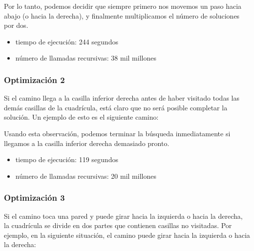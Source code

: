 Por lo tanto, podemos decidir que siempre primero
nos movemos un paso hacia abajo (o hacia la derecha),
y finalmente multiplicamos el número de soluciones por dos.

\begin{itemize}
\item
tiempo de ejecución: 244 segundos
\item
número de llamadas recursivas: 38 mil millones
\end{itemize}

\subsubsection{Optimización 2}

Si el camino llega a la casilla inferior derecha
antes de haber visitado todas las demás casillas de la cuadrícula,
está claro que
no será posible completar la solución.
Un ejemplo de esto es el siguiente camino:

\begin{center}
\end{center}
Usando esta observación, podemos terminar la búsqueda
inmediatamente si llegamos a la casilla inferior derecha demasiado pronto.
\begin{itemize}
\item
tiempo de ejecución: 119 segundos
\item
número de llamadas recursivas: 20 mil millones
\end{itemize}

\subsubsection{Optimización 3}

Si el camino toca una pared
y puede girar hacia la izquierda o hacia la derecha,
la cuadrícula se divide en dos partes
que contienen casillas no visitadas.
Por ejemplo, en la siguiente situación,
el camino puede girar hacia la izquierda o hacia la derecha:

